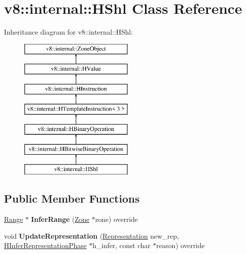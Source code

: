 \hypertarget{classv8_1_1internal_1_1_h_shl}{}\section{v8\+:\+:internal\+:\+:H\+Shl Class Reference}
\label{classv8_1_1internal_1_1_h_shl}
Inheritance diagram for v8\+:\+:internal\+:\+:H\+Shl\+:\begin{figure}[H]
\begin{center}
\leavevmode
\includegraphics[height=7.000000cm]{classv8_1_1internal_1_1_h_shl}
\end{center}
\end{figure}
\subsection*{Public Member Functions}
\begin{DoxyCompactItemize}
\item 
\hyperlink{classv8_1_1internal_1_1_range}{Range} $\ast$ {\bfseries Infer\+Range} (\hyperlink{classv8_1_1internal_1_1_zone}{Zone} $\ast$zone) override\hypertarget{classv8_1_1internal_1_1_h_shl_ac61fe4574b5cc158b2411fe2dd899d67}{}\label{classv8_1_1internal_1_1_h_shl_ac61fe4574b5cc158b2411fe2dd899d67}

\item 
void {\bfseries Update\+Representation} (\hyperlink{classv8_1_1internal_1_1_representation}{Representation} new\+\_\+rep, \hyperlink{classv8_1_1internal_1_1_h_infer_representation_phase}{H\+Infer\+Representation\+Phase} $\ast$h\+\_\+infer, const char $\ast$reason) override\hypertarget{classv8_1_1internal_1_1_h_shl_ac545ef132df63facf2f89e2252fc6749}{}\label{classv8_1_1internal_1_1_h_shl_ac545ef132df63facf2f89e2252fc6749}

\end{DoxyCompactItemize}
